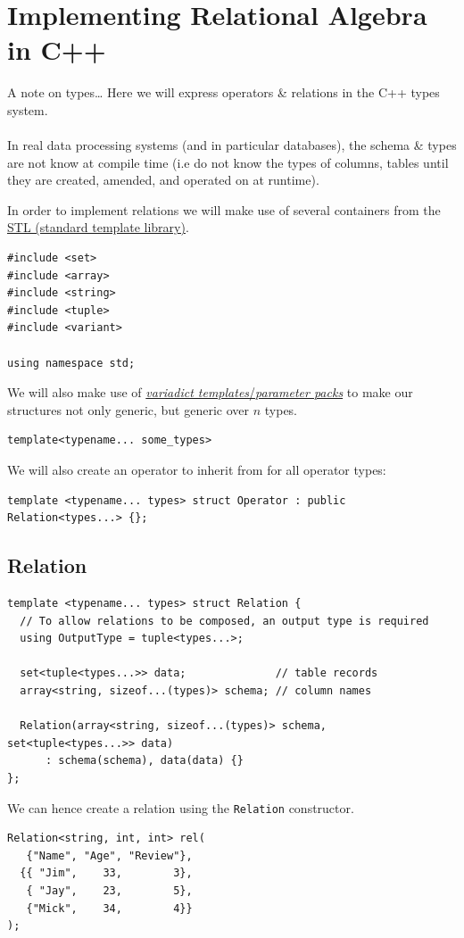 \section{Implementing Relational Algebra in C++}
\begin{sidenotebox}{A note on types\dots}
  Here we will express operators \& relations in the C++ types system.
  \\
  \\ In real data processing systems (and in particular databases), the schema \& types are not know at compile time (i.e do not know the types of columns, tables until they are created, amended, and operated on at runtime).
\end{sidenotebox}
\noindent
In order to implement relations we will make use of several containers from the
\href{https://en.wikipedia.org/wiki/Standard_Template_Library}{STL (standard template library)}.
\begin{verbatim}
#include <set>
#include <array>
#include <string>
#include <tuple>
#include <variant>

using namespace std;
\end{verbatim}
We will also make use of \href{https://en.cppreference.com/w/cpp/language/parameter_pack}{\textit{variadict templates}/\textit{parameter packs}} to make our structures not only generic, but generic over $n$ types.
\begin{verbatim}
template<typename... some_types>
\end{verbatim}
We will also create an operator to inherit from for all operator types:
\begin{verbatim}
template <typename... types> struct Operator : public Relation<types...> {};
\end{verbatim}

\subsection{Relation}
\begin{verbatim}
template <typename... types> struct Relation {
  // To allow relations to be composed, an output type is required
  using OutputType = tuple<types...>;

  set<tuple<types...>> data;              // table records
  array<string, sizeof...(types)> schema; // column names

  Relation(array<string, sizeof...(types)> schema, set<tuple<types...>> data)
      : schema(schema), data(data) {}
};
\end{verbatim}
\noindent
We can hence create a relation using the \texttt{Relation} constructor.
\begin{verbatim}
Relation<string, int, int> rel(
   {"Name", "Age", "Review"},
  {{ "Jim",    33,        3}, 
   { "Jay",    23,        5}, 
   {"Mick",    34,        4}}
);
\end{verbatim}

